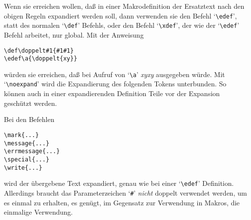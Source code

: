Wenn sie erreichen wollen, da\ss{} in einer Makrodefinition der
Ersatztext
nach den obigen Regeln expandiert werden soll, dann verwenden sie den
Befehl 
`\verb|\edef|', statt des normalen `\verb|\def|' Befehls, oder
den Befehl 
`\verb|\xdef|', der wie der `\verb|\edef|' Befehl arbeitet,
nur global. Mit der Anweisung
\begin{verbatim}
\def\doppelt#1{#1#1}
\edef\a{\doppelt{xy}}
\end{verbatim}
w\"urden sie erreichen, da\ss{} bei Aufruf von `\verb|\a|' {\em xyxy}
ausgegeben w\"urde. Mit 
`\verb|\noexpand|' wird die
Expandierung des folgenden Tokens unterbunden. So k\"onnen auch in einer
expandierenden Definition Teile vor der Expansion gesch\"utzt werden.

Bei den Befehlen
\begin{verbatim}
\mark{...}
\message{...}
\errmessage{...}
\special{...}
\write{...}
\end{verbatim}
wird der \"ubergebene Text expandiert, genau wie bei einer
`\verb|\edef|'
Definition. Allerdings braucht das 
Parameterzeichen `\verb|#|' {\em
nicht} doppelt verwendet werden, um es einmal zu erhalten, es gen\"ugt,
im Gegensatz zur Verwendung in Makros, die einmalige Verwendung.
